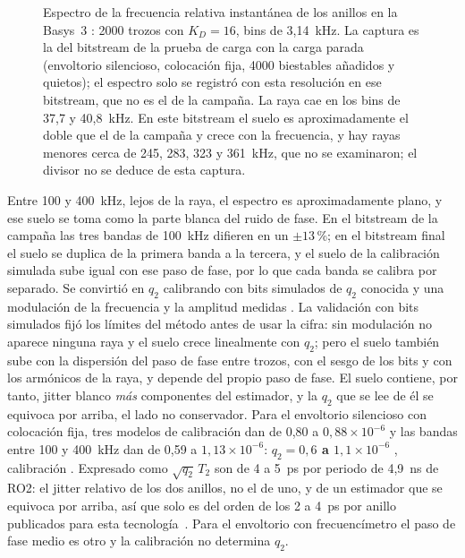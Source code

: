 \begin{figure}[htbp]
\caption{Espectro de la frecuencia relativa instantánea de los anillos
en la Basys~3 \meas{}: 2000 trozos con $K_D = 16$, bins de 3,14~kHz. La
captura es la del bitstream de la prueba de carga con la carga parada
(envoltorio silencioso, colocación fija, 4000 biestables añadidos y
quietos); el espectro solo se registró con esta resolución en ese
bitstream, que no es el de la campaña. La raya cae en los bins de 37,7 y
40,8~kHz. En este bitstream el suelo es aproximadamente el doble que el
de la campaña y crece con la frecuencia, y hay rayas menores cerca de
245, 283, 323 y 361~kHz, que no se examinaron; el divisor no se deduce de
esta captura.}
\label{fig:fpga_spectrum}
\end{figure}

Entre 100 y 400~kHz, lejos de la raya, el espectro es aproximadamente
plano, y ese suelo se toma como la parte blanca del ruido de fase. En el
bitstream de la campaña las tres bandas de 100~kHz difieren en un
$\pm13$\,\%; en el bitstream final el suelo se duplica de la primera
banda a la tercera, y el suelo de la calibración simulada sube igual con
ese paso de fase, por lo que cada banda se calibra por separado.
Se convirtió en $q_2$ calibrando con bits simulados de
$q_2$ conocida y una modulación de la frecuencia y la amplitud medidas
\simu{}. La validación con bits simulados fijó los límites del método
antes de usar la cifra: sin modulación no aparece ninguna raya y el suelo
crece linealmente con $q_2$; pero el suelo también sube con la dispersión
del paso de fase entre trozos, con el sesgo de los bits y con los
armónicos de la raya, y depende del propio paso de fase. El suelo
contiene, por tanto, jitter blanco \emph{más} componentes del estimador,
y la $q_2$ que se lee de él se equivoca por arriba, el lado no
conservador. Para el envoltorio silencioso con colocación fija, tres
modelos de calibración dan de 0,80 a $0{,}88\times10^{-6}$ y las bandas
entre 100 y 400~kHz dan de 0,59 a $1{,}13\times10^{-6}$: \textbf{$q_2 =
0{,}6$ a $1{,}1\times10^{-6}$} \meas{}, calibración \simu{}. Expresado
como $\sqrt{q_2}\,T_2$ son de 4 a 5~ps por periodo de 4,9~ns de RO2: el
jitter relativo de los dos anillos, no el de uno, y de un estimador que
se equivoca por arriba, así que solo es del orden de los 2 a 4~ps por
anillo publicados para esta tecnología~\cite{petura_2016_survey}.
Para el envoltorio con frecuencímetro el paso de fase medio es otro y la
calibración no determina $q_2$.

